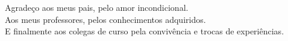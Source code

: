 
\begin{minipage}{\textwidth}
    Agradeço aos meus pais, pelo amor incondicional. \\
    Aos meus professores, pelos conhecimentos adquiridos. \\
     E finalmente aos colegas de curso pela convivência e trocas de experiências.
\end{minipage}


